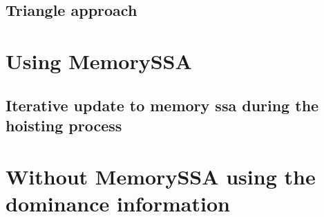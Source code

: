 \subsection{Triangle approach}


\section{Using MemorySSA}
\subsection{Iterative update to memory ssa during the hoisting process}

\section{Without MemorySSA using the dominance information}


